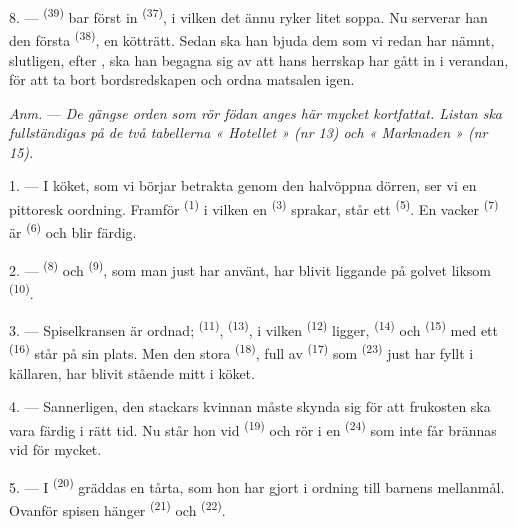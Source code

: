 8. ---  \textsuperscript{(39)} bar först in
 \textsuperscript{(37)}, i vilken det ännu ryker litet soppa.
Nu serverar han den första  \textsuperscript{(38)}, en kötträtt. Sedan ska han
bjuda dem som vi redan har nämnt, slutligen, efter
, ska han begagna sig av att hans herrskap har gått in
i verandan, för att ta bort bordsredskapen och ordna matsalen igen.

\textit{Anm.} --- \textit{De gängse orden som rör födan anges här mycket kortfattat. Listan
ska fullständigas på de två tabellerna « Hotellet » (nr 13) och « Marknaden » (nr 15).}

\VUsaut{4.6mm}
\VUsaut{3.0mm}

1. --- I köket, som vi börjar betrakta genom den halvöppna dörren, ser vi en pittoresk
oordning. Framför  \textsuperscript{(1)} i vilken en
 \textsuperscript{(3)} sprakar, står ett 
\textsuperscript{(5)}. En vacker  \textsuperscript{(7)} är
 \textsuperscript{(6)} och blir färdig.

2. ---  \textsuperscript{(8)} och 
\textsuperscript{(9)}, som man just har använt, har blivit liggande på golvet liksom
 \textsuperscript{(10)}.

3. --- Spiselkransen är ordnad;  \textsuperscript{(11)},
 \textsuperscript{(13)}, i vilken 
\textsuperscript{(12)} ligger,  \textsuperscript{(14)} och
 \textsuperscript{(15)} med ett 
\textsuperscript{(16)} står på sin plats. Men den stora 
\textsuperscript{(18)}, full av  \textsuperscript{(17)} som
 \textsuperscript{(23)} just har fyllt i källaren, har blivit
stående mitt i köket.

4. --- Sannerligen, den stackars kvinnan måste skynda sig för att frukosten ska vara färdig i
rätt tid. Nu står hon vid  \textsuperscript{(19)} och rör i en 
\textsuperscript{(24)} som inte får brännas vid för mycket.

5. --- I  \textsuperscript{(20)} gräddas en tårta, som hon har gjort i ordning
till barnens mellanmål. Ovanför spisen hänger  \textsuperscript{(21)} och
 \textsuperscript{(22)}.

